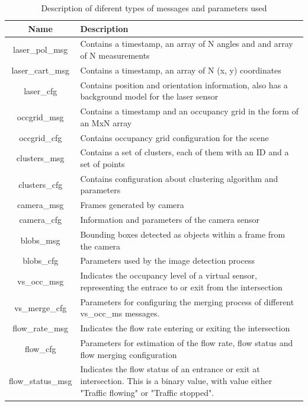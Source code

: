 \begin{table}[ht!]
\footnotesize
\centering
\begin{tabular}{|c | p{8cm}|}
\hline
\textbf{Name} & \textbf{Description} \\
\hline
laser\_pol\_msg & Contains a timestamp, an array of N angles and and array of N measurements \\
\hline
laser\_cart\_msg & Contains a timestamp, an array of N (x, y) coordinates \\
\hline
laser\_cfg & Contains position and orientation information, also has a background model for the laser sensor \\
\hline
occgrid\_msg & Contains a timestamp and an occupancy grid in the form of an MxN array \\
\hline
occgrid\_cfg & Contains occupancy grid configuration for the scene \\
\hline
clusters\_msg & Contains a set of clusters, each of them with an ID and a set of points \\
\hline

clusters\_cfg & Contains configuration about clustering algorithm and parameters \\
\hline

camera\_msg & Frames generated by camera \\
\hline

camera\_cfg & Information and parameters of the camera sensor \\
\hline

blobs\_msg & Bounding boxes detected as objects within a frame from the camera \\
\hline

blobs\_cfg & Parameters used by the image detection process\\
\hline

vs\_occ\_msg & Indicates the occupancy level of a virtual sensor, representing the entrace to or exit from the intersection\\
\hline

vs\_merge\_cfg & Parameters for configuring the merging process of different vs\_occ\_ms messages.\\
\hline

flow\_rate\_msg & Indicates the flow rate entering or exiting the intersection\\
\hline

flow\_cfg & Parameters for estimation of the flow rate, flow status and flow merging configuration\\
\hline

flow\_status\_msg & Indicates the flow status of an entrance or exit at intersection. This is a binary value, with value either "Traffic flowing" or "Traffic stopped".\\
\hline


\end{tabular}
\caption{Description of diferent types of messages and parameters used}
\label{desc_map}
\end{table}

